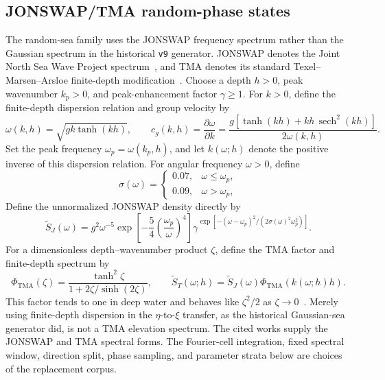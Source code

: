 \documentclass[11pt]{article}
\begin{document}
\subsection{JONSWAP/TMA random-phase states}
\label{sec:jonswap}

The random-sea family uses the JONSWAP frequency spectrum rather than the
Gaussian spectrum in the historical \texttt{v9} generator.  JONSWAP denotes
the Joint North Sea Wave Project spectrum~\cite{hasselmann1973}, and TMA
denotes its standard Texel--Marsen--Arsloe finite-depth
modification~\cite{bouws1985}.
Choose a depth $h>0$, peak wavenumber $k_p>0$, and peak-enhancement factor
$\gamma\geq1$.  For $k>0$, define the finite-depth dispersion relation and
group velocity by
\begin{equation}
  \omega(k,h)=\sqrt{gk\tanh(kh)},\qquad
  c_g(k,h)=\frac{\partial\omega}{\partial k}
  =\frac{g[\tanh(kh)+kh\,\operatorname{sech}^2(kh)]}
         {2\omega(k,h)}.
  \label{eq:group-velocity}
\end{equation}
Set the peak frequency $\omega_p=\omega(k_p,h)$, and let $k(\omega;h)$
denote the positive inverse of this dispersion relation.  For angular
frequency $\omega>0$, define
\begin{equation}
  \sigma(\omega)=
  \begin{cases}
    0.07,&\omega\leq\omega_p,\\
    0.09,&\omega>\omega_p,
  \end{cases}
  \label{eq:jonswap-width}
\end{equation}
Define the unnormalized JONSWAP density directly by
\begin{equation}
  \widetilde S_J(\omega)
  =g^2\omega^{-5}
    \exp\!\left[-\frac54\left(\frac{\omega_p}{\omega}\right)^4\right]
    \gamma^{\exp[-(\omega-\omega_p)^2/
      (2\sigma(\omega)^2\omega_p^2)]}.
  \label{eq:jonswap}
\end{equation}
For a dimensionless depth--wavenumber product $\zeta$, define the TMA factor
and finite-depth spectrum by
\begin{equation}
  \Phi_{\mathrm{TMA}}(\zeta)
  =\frac{\tanh^2\zeta}{1+2\zeta/\sinh(2\zeta)},\qquad
  \widetilde S_T(\omega;h)
  =\widetilde S_J(\omega)
    \Phi_{\mathrm{TMA}}(k(\omega;h)h).
  \label{eq:tma-factor}
\end{equation}
This factor tends to one in deep water and behaves like $\zeta^2/2$ as
$\zeta\to0$~\cite{bouws1985}.  Merely using finite-depth dispersion in the
$\eta$-to-$\xi$ transfer, as the historical Gaussian-sea generator did, is not a TMA
elevation spectrum.
The cited works supply the JONSWAP and TMA spectral forms.  The Fourier-cell
integration, fixed spectral window, direction split, phase sampling, and
parameter strata below are choices of the replacement corpus.
\end{document}
